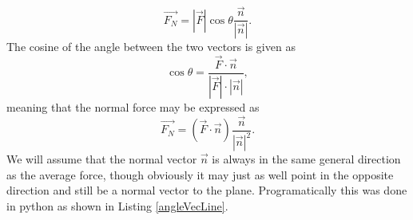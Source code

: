 \documentclass[twoside,english]{uiofysmaster}
\newcommand\lr[1]{\left(#1\right)}
\begin{document}
\begin{equation}
	\vec{F_N} 
	= |\vec{F}|\cos{\theta}\frac{\vec{n}}{|\vec{n}|} .
\end{equation}
The cosine of the angle between the two vectors is given as
\begin{equation}
	\cos{\theta} = \frac{\vec{F}\cdot\vec{n}}{|\vec{F}| \cdot |\vec{n}|},
\end{equation} 
meaning that the normal force may be expressed as
\begin{equation} 
\vec{F_N} = \lr{\vec{F}\cdot\vec{n}} \frac{\vec{n}}{|\vec{n}|^2} .
\end{equation}
We will assume that the normal vector $\vec{n}$ is always in the same general direction as the average force, though obviously it may just as well point in the opposite direction and still be a normal vector to the plane. Programatically this was done in python as shown in Listing \ref{angleVecLine}.


\end{document}
